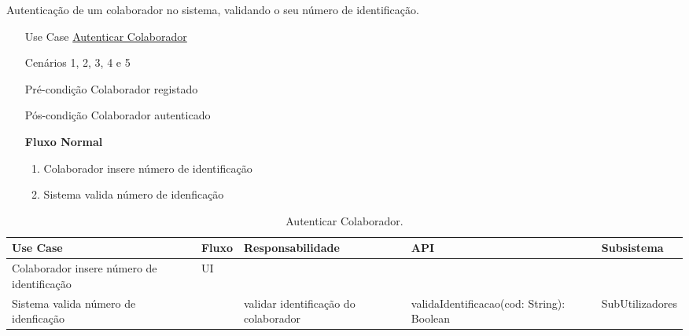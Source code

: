 \documentclass[../relatorio.tex]{subfiles}
\begin{document}
Autenticação de um colaborador no sistema, validando o seu número de identificação.
\begin{itemize}
    \item[Use Case] {\underline{Autenticar Colaborador}}
    \item[Cenários] {1, 2, 3, 4 e 5}
    \item[Pré-condição] {Colaborador registado}
    \item[Pós-condição] {Colaborador autenticado}
          \begin{flushleft}
              \textbf{Fluxo Normal}
          \end{flushleft}
          \begin{enumerate}
              \item Colaborador insere número de identificação
              \item Sistema valida número de idenficação
          \end{enumerate}
\end{itemize}
\begin{landscape}
    \begin{table}[!h]
        \centering
        \begin{tabular}{|p{5cm}|p{1cm}|p{4cm}|p{6cm}|p{3cm}|}
            \hline
            \rowcolor{gray!20!white}
            Use Case         & 
            Fluxo            & 
            Responsabilidade & 
            API              & 
            Subsistema
            \\
            \hline
            \rowcolor{yellow}
            Colaborador insere número de identificação
                             & UI
                             & 
                             & 
                             & 
            \\
            \hline
            Sistema valida número de idenficação
                             & 
                             & validar identificação do colaborador
                             & validaIdentificacao(cod: String): Boolean
                             & SubUtilizadores
            \\
            \hline
        \end{tabular}
        \caption{Autenticar Colaborador.}
    \end{table}
\end{landscape}
\end{document}
